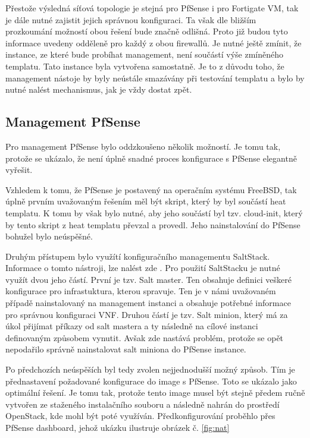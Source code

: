 Přestože výsledná síťová topologie je stejná pro PfSense i pro Fortigate VM, tak je dále nutné zajistit jejich správnou konfiguraci. Ta však dle bližším prozkoumání možností obou řešení bude značně odlišná. Proto již budou tyto informace uvedeny odděleně pro každý z obou firewallů. Je nutné ještě zmínit, že instance, ze které bude probíhat management, není součástí výše zmíněného templatu. Tato instance byla vytvořena samostatně. Je to z důvodu toho, že management nástoje by byly neústále smazávány při testování templatu a bylo by nutné nalést mechanismus, jak je vždy dostat zpět. 

\subsection{Management PfSense}\label{sub:interaction}

Pro management PfSense bylo oddzkoušeno několik možností. Je tomu tak, protože se ukázalo, že není úplně snadné proces konfigurace s PfSense elegantně vyřešit. 

Vzhledem k tomu, že PfSense je postavený na operačním systému FreeBSD, tak úplně prvním uvažovaným řešením měl být skript, který by byl součástí heat templatu. K tomu by však bylo nutné, aby jeho součástí byl tzv. cloud-init, který by tento skript z heat templatu převzal a provedl. Jeho nainstalování do PfSense bohužel bylo neúspěšné. 

Druhým přístupem bylo využítí konfiguračního managementu SaltStack. Informace o tomto nástroji, lze nalést zde \cite{salt}. Pro použití SaltStacku je nutné využít dvou jeho částí. První je tzv. Salt master. Ten obsahuje definici veškeré konfigurace pro infrastuktura, kterou spravuje. Ten je v námi uvažovaném případě nainstalovaný na management instanci a obsahuje potřebné informace pro správnou konfiguraci VNF. Druhou částí je tzv. Salt minion, který má za úkol přijímat příkazy od salt mastera a ty následně na cílové instanci definovaným způsobem vynutit. Avšak zde nastává problém, protože se opět nepodařilo správně nainstalovat salt miniona do PfSense instance.

Po předchozích neúspěších byl tedy zvolen nejjednodušší možný způsob. Tím je přednastavení požadované konfigurace do image s PfSense. Toto se ukázalo jako optimální řešení. Je tomu tak, protože tento image musel být stejně předem ručně vytvořen ze staženého instalačního souboru a následně nahrán do prostředí OpenStack, kde mohl být poté využíván. Předkonfigurování proběhlo přes PfSense dashboard, jehož ukázku ilustruje obrázek č. \ref{fig:nat}

